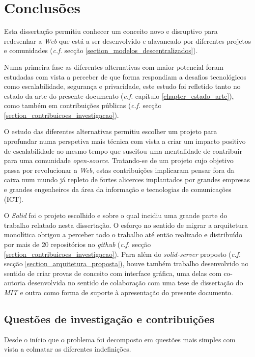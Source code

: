 
\chapter{Conclusões}
\label{cap:7}

Esta dissertação permitiu conhecer um conceito novo e disruptivo para redesenhar a \emph{Web} que está a ser desenvolvido e alavancado por diferentes projetos e comunidades (\emph{c.f.} secção \ref{section_modelos_descentralizados}).

Numa primeira fase as diferentes alternativas com maior potencial foram estudadas com vista a perceber de que forma respondiam a desafios tecnológicos como escalabilidade, segurança e privacidade, este estudo foi refletido tanto no estado da arte do presente documento (\emph{c.f.} capítulo \ref{chapter_estado_arte}), como também em contribuições públicas (\emph{c.f.} secção \ref{section_contribuicoes_investigacao}).

O estudo das diferentes alternativas permitiu escolher um projeto para aprofundar numa perspetiva mais técnica com vista a criar um impacto positivo de escalabilidade ao mesmo tempo que suscitou uma mentalidade de contribuir para uma comunidade \emph{open-source}. Tratando-se de um projeto cujo objetivo passa por revolucionar a \emph{Web}, estas contribuições implicaram pensar fora da caixa num mundo já repleto de fortes alicerces implantados por grandes empresas e grandes engenheiros da área da informação e tecnologias de comunicações (ICT).

O \emph{Solid} foi o projeto escolhido e sobre o qual incidiu uma grande parte do trabalho relatado nesta dissertação. O esforço no sentido de migrar a arquitetura monolítica obrigou a perceber todo o trabalho até então realizado e distribuído por mais de 20 repositórios no \emph{github} (\emph{c.f.} secção \ref{section_contribuicoes_investigacao}). Para além do \emph{solid-server} proposto (\emph{c.f.} secção \ref{section_arquitetura_proposta}), houve também trabalho desenvolvido no sentido de criar provas de conceito com interface gráfica, uma delas com co-autoria desenvolvida no sentido de colaboração com uma tese de dissertação do \emph{\acrshort{MIT}} e outra como forma de suporte à apresentação do presente documento.

\section{Questões de investigação e contribuições}
Desde o início que o problema foi decomposto em questões mais simples com vista a colmatar as diferentes indefinições.

